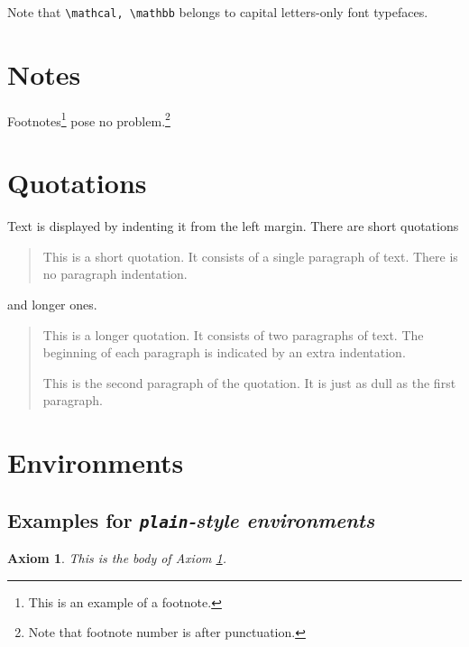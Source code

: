 \documentclass[aoas]{imsart}
\numberwithin{equation}{section}
\theoremstyle{plain}
\newtheorem{axiom}{Axiom}
\theoremstyle{remark}
\begin{document}
Note that \verb|\mathcal, \mathbb| belongs to capital letters-only font
typefaces.

\hypertarget{notes}{%
\section{Notes}\label{notes}}

Footnotes\footnote{This is an example of a footnote.} pose no
problem.\footnote{Note that footnote number is after punctuation.}

\hypertarget{quotations}{%
\section{Quotations}\label{quotations}}

Text is displayed by indenting it from the left margin. There are short
quotations

\begin{quote}
This is a short quotation. It consists of a single paragraph of text.
There is no paragraph indentation.
\end{quote}

and longer ones.

\begin{quotation}
This is a longer quotation. It consists of two paragraphs of text. The
beginning of each paragraph is indicated by an extra indentation.

This is the second paragraph of the quotation. It is just as dull as the
first paragraph.

\end{quotation}

\hypertarget{environments}{%
\section{Environments}\label{environments}}

\hypertarget{examples-for-plain-style-environments}{%
\subsection{\texorpdfstring{Examples for \emph{\texttt{plain}-style
environments}}{Examples for plain-style environments}}\label{examples-for-plain-style-environments}}

\begin{axiom}
\label{ax1} This is the body of Axiom \ref{ax1}.

\end{axiom}
\end{document}
